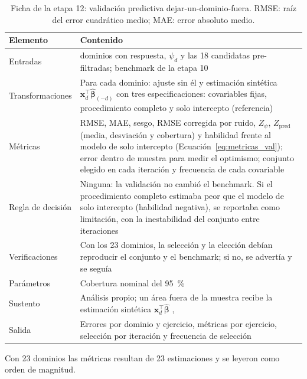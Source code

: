 \begin{table}[!htbp]
\centering
\small
\caption[Ficha de la etapa 12: validación predictiva dejar-un-dominio-fuera]{Ficha de la etapa 12: validación predictiva dejar-un-dominio-fuera. RMSE: raíz del error cuadrático medio; MAE: error absoluto medio.}
\label{tab:met_validacion}
\renewcommand{\arraystretch}{1.15}
\begin{tabularx}{\linewidth}{>{\raggedright\arraybackslash}p{2.8cm} >{\raggedright\arraybackslash}X}
\toprule
Elemento & Contenido \\
\midrule
Entradas & 23 dominios con respuesta, $\psi_d$ y las 18 candidatas pre-filtradas; benchmark de la etapa 10 \\
Transformaciones & Para cada dominio: ajuste sin él y estimación sintética $\mathbf{x}_d^\top\hat{\boldsymbol{\beta}}_{(-d)}$ con tres especificaciones: covariables fijas, procedimiento completo y solo intercepto (referencia) \\
Métricas & RMSE, MAE, sesgo, RMSE corregida por ruido, $Z_\psi$, $Z_{\text{pred}}$ (media, desviación y cobertura) y habilidad frente al modelo de solo intercepto (Ecuación~\ref{eq:metricas_val}); error dentro de muestra para medir el optimismo; conjunto elegido en cada iteración y frecuencia de cada covariable \\
Regla de decisión & Ninguna: la validación no cambió el benchmark. Si el procedimiento completo estimaba peor que el modelo de solo intercepto (habilidad negativa), se reportaba como limitación, con la inestabilidad del conjunto entre iteraciones \\
Verificaciones & Con los 23 dominios, la selección y la elección debían reproducir el conjunto y el benchmark; si no, se advertía y se seguía \\
Parámetros & Cobertura nominal del 95~\% \\
Sustento & Análisis propio; un área fuera de la muestra recibe la estimación sintética $\mathbf{x}_d^\top\hat{\boldsymbol{\beta}}$ \cite[p.~441]{morales2021smallarea}, \cite[p.~144]{Benedetti2024} \\
Salida & Errores por dominio y ejercicio, métricas por ejercicio, selección por iteración y frecuencia de selección \\
\bottomrule
\end{tabularx}
\end{table}

Con 23 dominios las métricas resultan de 23 estimaciones y se leyeron como orden de magnitud.

